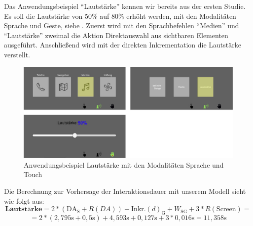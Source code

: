 Das Anwendungsbeispiel "`Lautstärke"' kennen wir bereits aus der ersten Studie. 
Es soll die Lautstärke von 50\% auf 80\% erhöht werden, mit den Modalitäten Sprache und Geste, siehe . 
Zuerst wird mit den Sprachbefehlen "`Medien"' und "`Lautstärke"' zweimal die Aktion Direktauswahl aus sichtbaren Elementen ausgeführt. 
Anschließend wird mit der direkten Inkrementation die Lautstärke verstellt. 
\begin{figure}
	\centering
		\includegraphics[width=1\textwidth]{img/UseCases_Eval_MedienS.jpg}
	\caption{Anwendungsbeispiel Lautstärke mit den Modalitäten Sprache und Touch}
	\label{fig:UseCasesEvalMedienS}
\end{figure}
Die Berechnung zur Vorhersage der Interaktionsdauer mit unserem Modell sieht wie folgt aus:
\[
\textbf{Lautstärke} = 2*(\text{DA}_\text{S} + R(DA)) + \text{Inkr.} (d)_\text{G} + W_\text{SG} + 3*R(\text{Screen}) =
\]
\[
= 2*( 2,795\text{s} + 0,5\text{s}) + 4,593\text{s} + 0,127\text{s} + 3*0,016\text{s} = 11,358 \text{s}
\]

